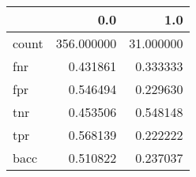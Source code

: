 \begin{tabular}{lrr}
\toprule
{} &         0.0 &        1.0 \\
\midrule
count &  356.000000 &  31.000000 \\
fnr   &    0.431861 &   0.333333 \\
fpr   &    0.546494 &   0.229630 \\
tnr   &    0.453506 &   0.548148 \\
tpr   &    0.568139 &   0.222222 \\
bacc  &    0.510822 &   0.237037 \\
\bottomrule
\end{tabular}
